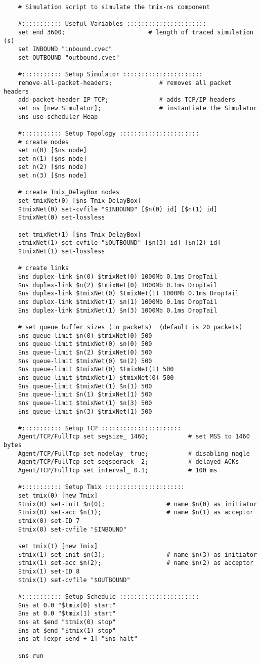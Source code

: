 \begin{verbatim}
	# Simulation script to simulate the tmix-ns component

	#::::::::::: Useful Variables ::::::::::::::::::::::
	set end 3600;                       # length of traced simulation (s)
	set INBOUND "inbound.cvec"
	set OUTBOUND "outbound.cvec"

	#::::::::::: Setup Simulator ::::::::::::::::::::::
	remove-all-packet-headers;             # removes all packet headers
	add-packet-header IP TCP;              # adds TCP/IP headers
	set ns [new Simulator];                # instantiate the Simulator
	$ns use-scheduler Heap

	#::::::::::: Setup Topology ::::::::::::::::::::::
	# create nodes
	set n(0) [$ns node]
	set n(1) [$ns node]
	set n(2) [$ns node]
	set n(3) [$ns node]

	# create Tmix_DelayBox nodes
	set tmixNet(0) [$ns Tmix_DelayBox]
	$tmixNet(0) set-cvfile "$INBOUND" [$n(0) id] [$n(1) id]
	$tmixNet(0) set-lossless

	set tmixNet(1) [$ns Tmix_DelayBox]
	$tmixNet(1) set-cvfile "$OUTBOUND" [$n(3) id] [$n(2) id]
	$tmixNet(1) set-lossless

	# create links
	$ns duplex-link $n(0) $tmixNet(0) 1000Mb 0.1ms DropTail
	$ns duplex-link $n(2) $tmixNet(0) 1000Mb 0.1ms DropTail
	$ns duplex-link $tmixNet(0) $tmixNet(1) 1000Mb 0.1ms DropTail
	$ns duplex-link $tmixNet(1) $n(1) 1000Mb 0.1ms DropTail
	$ns duplex-link $tmixNet(1) $n(3) 1000Mb 0.1ms DropTail

	# set queue buffer sizes (in packets)  (default is 20 packets)
	$ns queue-limit $n(0) $tmixNet(0) 500
	$ns queue-limit $tmixNet(0) $n(0) 500
	$ns queue-limit $n(2) $tmixNet(0) 500
	$ns queue-limit $tmixNet(0) $n(2) 500
	$ns queue-limit $tmixNet(0) $tmixNet(1) 500
	$ns queue-limit $tmixNet(1) $tmixNet(0) 500
	$ns queue-limit $tmixNet(1) $n(1) 500
	$ns queue-limit $n(1) $tmixNet(1) 500
	$ns queue-limit $tmixNet(1) $n(3) 500
	$ns queue-limit $n(3) $tmixNet(1) 500
	
	#::::::::::: Setup TCP ::::::::::::::::::::::
	Agent/TCP/FullTcp set segsize_ 1460;           # set MSS to 1460 bytes
	Agent/TCP/FullTcp set nodelay_ true;           # disabling nagle
	Agent/TCP/FullTcp set segsperack_ 2;           # delayed ACKs
	Agent/TCP/FullTcp set interval_ 0.1;           # 100 ms

	#::::::::::: Setup Tmix ::::::::::::::::::::::
	set tmix(0) [new Tmix]
	$tmix(0) set-init $n(0);                 # name $n(0) as initiator
	$tmix(0) set-acc $n(1);                  # name $n(1) as acceptor
	$tmix(0) set-ID 7
	$tmix(0) set-cvfile "$INBOUND"

	set tmix(1) [new Tmix]
	$tmix(1) set-init $n(3);                 # name $n(3) as initiator
	$tmix(1) set-acc $n(2);                  # name $n(2) as acceptor
	$tmix(1) set-ID 8
	$tmix(1) set-cvfile "$OUTBOUND"

	#::::::::::: Setup Schedule ::::::::::::::::::::::
	$ns at 0.0 "$tmix(0) start"
	$ns at 0.0 "$tmix(1) start"
	$ns at $end "$tmix(0) stop"
	$ns at $end "$tmix(1) stop"
	$ns at [expr $end + 1] "$ns halt"

	$ns run
\end{verbatim}

